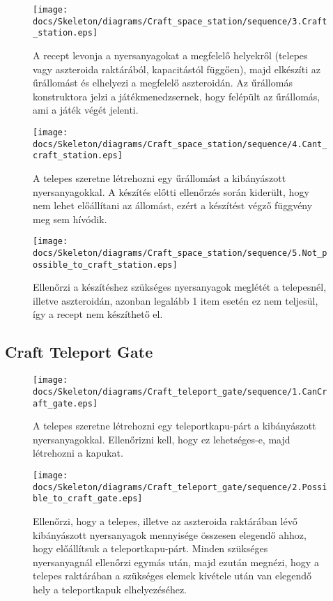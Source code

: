 \begin{figure}[H] 
    \centering 
    \texttt{[image: docs/Skeleton/diagrams/Craft\_space\_station/sequence/3.Craft\_station.eps]} 
    \caption{A recept levonja a nyersanyagokat a megfelelő helyekről (telepes vagy aszteroida raktárából, kapacitástól függően),  majd elkészíti az űrállomást és elhelyezi a megfelelő aszteroidán. Az űrállomás konstruktora jelzi a játékmenedzsernek, hogy felépült az űrállomás, ami a játék végét jelenti. } 
\end{figure} 

\begin{figure}[H] 
    \centering 
    \texttt{[image: docs/Skeleton/diagrams/Craft\_space\_station/sequence/4.Cant\_craft\_station.eps]} 
    \caption{A telepes szeretne létrehozni egy űrállomást a kibányászott nyersanyagokkal.  A készítés előtti ellenőrzés során kiderült, hogy nem lehet előállítani az állomást, ezért a készítést végző függvény meg sem hívódik.} 
\end{figure} 

\begin{figure}[H] 
    \centering 
    \texttt{[image: docs/Skeleton/diagrams/Craft\_space\_station/sequence/5.Not\_possible\_to\_craft\_station.eps]} 
    \caption{Ellenőrzi a készítéshez szükséges nyersanyagok meglétét a telepesnél, illetve aszteroidán, azonban legalább 1 item esetén ez nem teljesül, így a recept nem készíthető el.  } 
\end{figure} 

\subsection{Craft Teleport Gate}

\begin{figure}[H] 
    \centering 
    \texttt{[image: docs/Skeleton/diagrams/Craft\_teleport\_gate/sequence/1.CanCraft\_gate.eps]} 
    \caption{A telepes szeretne létrehozni egy teleportkapu-párt a kibányászott nyersanyagokkal.  Ellenőrizni kell, hogy ez lehetséges-e, majd létrehozni a kapukat.} 
\end{figure} 

\begin{figure}[H] 
    \centering 
    \texttt{[image: docs/Skeleton/diagrams/Craft\_teleport\_gate/sequence/2.Possible\_to\_craft\_gate.eps]} 
    \caption{Ellenőrzi, hogy a telepes, illetve az aszteroida raktárában lévő kibányászott nyersanyagok mennyisége összesen elegendő ahhoz, hogy előállítsuk a teleportkapu-párt. Minden szükséges nyersanyagnál ellenőrzi egymás után, majd ezután megnézi, hogy a telepes raktárában a szükséges elemek kivétele után van elegendő hely a teleportkapuk elhelyezéséhez. } 
\end{figure}

